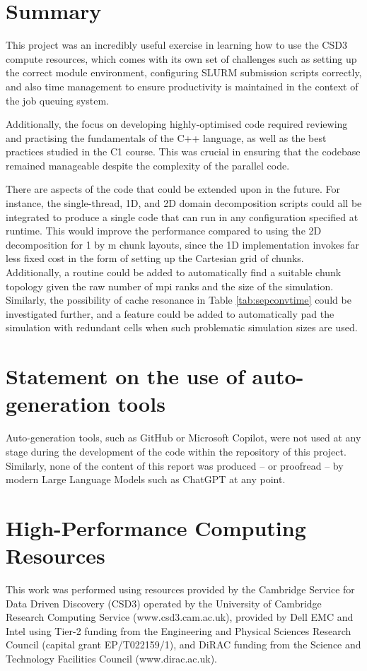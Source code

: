 \documentclass[12pt]{article}
\begin{document}
\section*{Summary}

This project was an incredibly useful exercise in learning how to use the CSD3 compute resources,
which comes with its own set of challenges such as setting up the correct module environment,
configuring SLURM submission scripts correctly,
and also time management to ensure productivity is maintained in the context of the job queuing system.

Additionally, the focus on developing highly-optimised code required reviewing and practising the fundamentals of the C++ language,
as well as the best practices studied in the C1 course.
This was crucial in ensuring that the codebase remained manageable despite the complexity of the parallel code.

There are aspects of the code that could be extended upon in the future.
For instance, the single-thread, 1D, and 2D domain decomposition scripts could all be integrated to produce a single code that can run in any configuration specified at runtime.
This would improve the performance compared to using the 2D decomposition for 1 by m chunk layouts,
since the 1D implementation invokes far less fixed cost in the form of setting up the Cartesian grid of chunks.
Additionally, a routine could be added to automatically find a suitable chunk topology given the raw number of mpi ranks and the size of the simulation.
Similarly, the possibility of cache resonance in Table \ref{tab:sepconvtime} could be investigated further,
and a feature could be added to automatically pad the simulation with redundant cells when such problematic simulation sizes are used.




\appendix

\section{Statement on the use of auto-generation tools}

Auto-generation tools, such as GitHub or Microsoft Copilot, were not used at any stage during the development of the code within the repository of this project.
Similarly, none of the content of this report was produced -- or proofread -- by modern Large Language Models such as ChatGPT at any point.

\section {High-Performance Computing Resources}

This work was performed using resources provided by the Cambridge Service for Data Driven Discovery (CSD3) operated by the University of Cambridge Research Computing Service (www.csd3.cam.ac.uk),
provided by Dell EMC and Intel using Tier-2 funding from the Engineering and Physical Sciences Research Council (capital grant EP/T022159/1),
and DiRAC funding from the Science and Technology Facilities Council (www.dirac.ac.uk).
\end{document}
